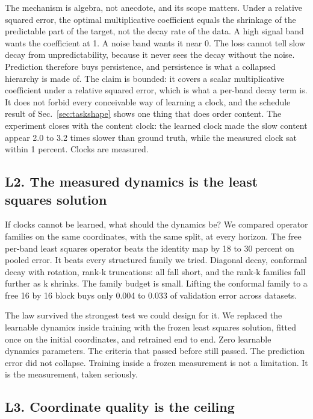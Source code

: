 \documentclass[11pt]{article}
\begin{document}
The mechanism is algebra, not anecdote, and its scope matters.
Under a relative squared error, the optimal multiplicative coefficient equals the shrinkage of the predictable part of the target, not the decay rate of the data.
A high signal band wants the coefficient at 1.
A noise band wants it near 0.
The loss cannot tell slow decay from unpredictability, because it never sees the decay without the noise.
Prediction therefore buys persistence, and persistence is what a collapsed hierarchy is made of.
The claim is bounded: it covers a scalar multiplicative coefficient under a relative squared error, which is what a per-band decay term is.
It does not forbid every conceivable way of learning a clock, and the schedule result of Sec.~\ref{sec:taskshape} shows one thing that does order content.
The experiment closes with the content clock: the learned clock made the slow content appear 2.0 to 3.2 times slower than ground truth, while the measured clock sat within 1 percent.
Clocks are measured.

\subsection{L2. The measured dynamics is the least squares solution}
\label{sec:l2}

If clocks cannot be learned, what should the dynamics be?
We compared operator families on the same coordinates, with the same split, at every horizon.
The free per-band least squares operator beats the identity map by 18 to 30 percent on pooled error.
It beats every structured family we tried.
Diagonal decay, conformal decay with rotation, rank-k truncations: all fall short, and the rank-k families fall further as k shrinks.
The family budget is small.
Lifting the conformal family to a free 16 by 16 block buys only 0.004 to 0.033 of validation error across datasets.

The law survived the strongest test we could design for it.
We replaced the learnable dynamics inside training with the frozen least squares solution, fitted once on the initial coordinates, and retrained end to end.
Zero learnable dynamics parameters.
The criteria that passed before still passed.
The prediction error did not collapse.
Training inside a frozen measurement is not a limitation.
It is the measurement, taken seriously.

\subsection{L3. Coordinate quality is the ceiling}
\label{sec:l3}
\end{document}
